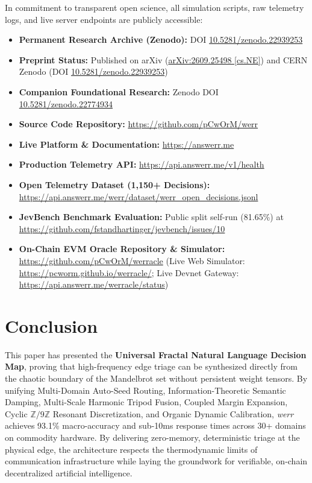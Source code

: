 \documentclass[10pt,journal,compsoc,twocolumn]{article}
\begin{document}
In commitment to transparent open science, all simulation scripts, raw telemetry logs, and live server endpoints are publicly accessible:
\begin{itemize}
    \item \textbf{Permanent Research Archive (Zenodo):} DOI \href{https://doi.org/10.5281/zenodo.22939253}{10.5281/zenodo.22939253}
    \item \textbf{Preprint Status:} Published on arXiv (\href{https://arxiv.org/abs/2609.25498}{arXiv:2609.25498 [cs.NE]}) and CERN Zenodo (DOI \href{https://doi.org/10.5281/zenodo.22939253}{10.5281/zenodo.22939253})
    \item \textbf{Companion Foundational Research:} Zenodo DOI \href{https://doi.org/10.5281/zenodo.22774934}{10.5281/zenodo.22774934}
    \item \textbf{Source Code Repository:} \url{https://github.com/pCwOrM/werr}
    \item \textbf{Live Platform \& Documentation:} \url{https://answerr.me}
    \item \textbf{Production Telemetry API:} \url{https://api.answerr.me/v1/health}
    \item \textbf{Open Telemetry Dataset (1,150+ Decisions):} \url{https://api.answerr.me/werr/dataset/werr_open_decisions.jsonl}
    \item \textbf{JevBench Benchmark Evaluation:} Public split self-run (81.65\%) at \url{https://github.com/fstandhartinger/jevbench/issues/10}
    \item \textbf{On-Chain EVM Oracle Repository \& Simulator:} \url{https://github.com/pCwOrM/werracle} (Live Web Simulator: \url{https://pcworm.github.io/werracle/}; Live Devnet Gateway: \url{https://api.answerr.me/werracle/status})
\end{itemize}

\section{Conclusion}

This paper has presented the \textbf{Universal Fractal Natural Language Decision Map}, proving that high-frequency edge triage can be synthesized directly from the chaotic boundary of the Mandelbrot set without persistent weight tensors. By unifying Multi-Domain Auto-Seed Routing, Information-Theoretic Semantic Damping, Multi-Scale Harmonic Tripod Fusion, Coupled Margin Expansion, Cyclic $\mathbb{Z}/9\mathbb{Z}$ Resonant Discretization, and Organic Dynamic Calibration, \textit{werr} achieves 93.1\% macro-accuracy and sub-10ms response times across 30+ domains on commodity hardware. By delivering zero-memory, deterministic triage at the physical edge, the architecture respects the thermodynamic limits of communication infrastructure while laying the groundwork for verifiable, on-chain decentralized artificial intelligence.
\end{document}

